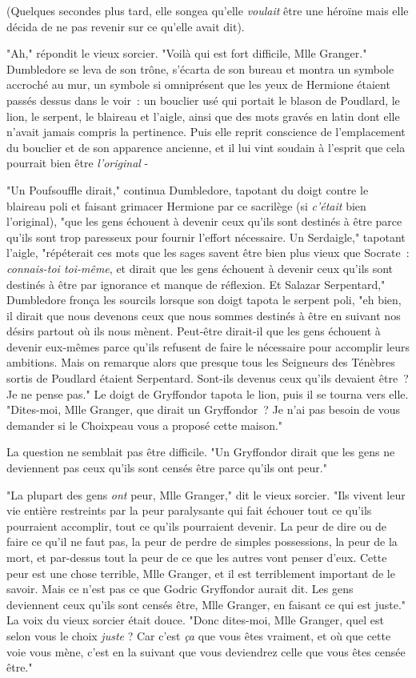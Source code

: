 (Quelques secondes plus tard, elle songea qu'elle \emph{voulait} être une héroïne mais elle décida de ne pas revenir sur ce qu'elle avait dit).

"Ah," répondit le vieux sorcier. "Voilà qui est fort difficile, Mlle Granger." Dumbledore se leva de son trône, s'écarta de son bureau et montra un symbole accroché au mur, un symbole si omniprésent que les yeux de Hermione étaient passés dessus dans le voir~: un bouclier usé qui portait le blason de Poudlard, le lion, le serpent, le blaireau et l'aigle, ainsi que des mots gravés en latin dont elle n'avait jamais compris la pertinence. Puis elle reprit conscience de l'emplacement du bouclier et de son apparence ancienne, et il lui vint soudain à l'esprit que cela pourrait bien être \emph{l'original} -

"Un Poufsouffle dirait," continua Dumbledore, tapotant du doigt contre le blaireau poli et faisant grimacer Hermione par ce sacrilège (si \emph{c'était} bien l'original), "que les gens échouent à devenir ceux qu'ils sont destinés à être parce qu'ils sont trop paresseux pour fournir l'effort nécessaire. Un Serdaigle," tapotant l'aigle, "répéterait ces mots que les sages savent être bien plus vieux que Socrate~: \emph{connais-toi toi-même}, et dirait que les gens échouent à devenir ceux qu'ils sont destinés à être par ignorance et manque de réflexion. Et Salazar Serpentard," Dumbledore fronça les sourcils lorsque son doigt tapota le serpent poli, "eh bien, il dirait que nous devenons ceux que nous sommes destinés à être en suivant nos désirs partout où ils nous mènent. Peut-être dirait-il que les gens échouent à devenir eux-mêmes parce qu'ils refusent de faire le nécessaire pour accomplir leurs ambitions. Mais on remarque alors que presque tous les Seigneurs des Ténèbres sortis de Poudlard étaient Serpentard. Sont-ils devenus ceux qu'ils devaient être~? Je ne pense pas." Le doigt de Gryffondor tapota le lion, puis il se tourna vers elle. "Dites-moi, Mlle Granger, que dirait un Gryffondor~? Je n'ai pas besoin de vous demander si le Choixpeau vous a proposé cette maison."

La question ne semblait pas être difficile. "Un Gryffondor dirait que les gens ne deviennent pas ceux qu'ils sont censés être parce qu'ils ont peur."

"La plupart des gens \emph{ont} peur, Mlle Granger," dit le vieux sorcier. "Ils vivent leur vie entière restreints par la peur paralysante qui fait échouer tout ce qu'ils pourraient accomplir, tout ce qu'ils pourraient devenir. La peur de dire ou de faire ce qu'il ne faut pas, la peur de perdre de simples possessions, la peur de la mort, et par-dessus tout la peur de ce que les autres vont penser d'eux. Cette peur est une chose terrible, Mlle Granger, et il est terriblement important de le savoir. Mais ce n'est pas ce que Godric Gryffondor aurait dit. Les gens deviennent ceux qu'ils sont censés être, Mlle Granger, en faisant ce qui est juste." La voix du vieux sorcier était douce. "Donc dites-moi, Mlle Granger, quel est selon vous le choix \emph{juste} ? Car c'est \emph{ça} que vous êtes vraiment, et où que cette voie vous mène, c'est en la suivant que vous deviendrez celle que vous êtes censée être."

